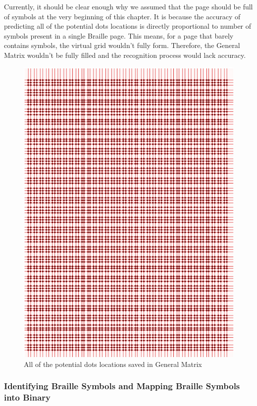 Currently, it should be clear enough why we assumed that the page should be full of symbols at the very beginning of this chapter. It is because the accuracy of predicting all of the potential dots locations is directly proportional to number of symbols present in a single Braille page. This means, for a page that barely contains symbols, the virtual grid wouldn't fully form. Therefore, the General Matrix wouldn't be fully filled and the recognition process would lack accuracy.
\begin{figure}[H]
    \centering
    \includegraphics[width=0.8\linewidth]{Hough/red.jpg}
    \caption{All of the potential dots locations saved in General Matrix}
    \label{fig:num9}
\end{figure}

\subsubsection{Identifying Braille Symbols and Mapping Braille Symbols into Binary}

